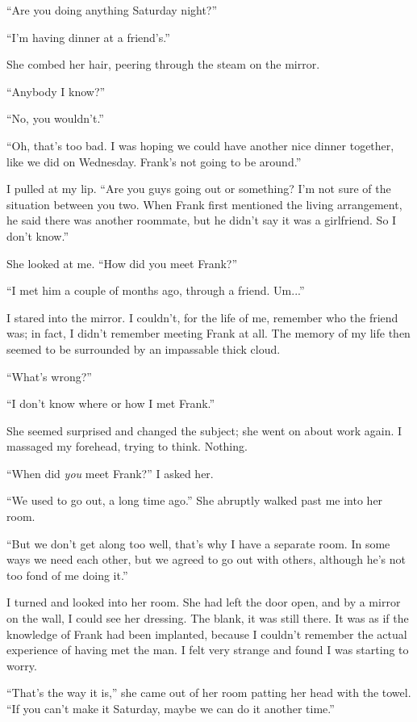 ``Are you doing anything Saturday night?''

``I'm having dinner at a friend's.''

She combed her hair, peering through the steam on the mirror.

``Anybody I know?''

``No, you wouldn't.''

``Oh, that's too bad. I was hoping we could have another nice dinner
together, like we did on Wednesday. Frank's not going to be around.''

I pulled at my lip. ``Are you guys going out or something? I'm not sure
of the situation between you two. When Frank first mentioned the living
arrangement, he said there was another roommate, but he didn't say it
was a girlfriend. So I don't know.''

She looked at me. ``How did you meet Frank?''

``I met him a couple of months ago, through a friend. Um...''

I stared into the mirror. I couldn't, for the life of me, remember who
the friend was; in fact, I didn't remember meeting Frank at all. The
memory of my life then seemed to be surrounded by an impassable thick
cloud.

``What's wrong?''

``I don't know where or how I met Frank.''

She seemed surprised and changed the subject; she went on about work
again. I massaged my forehead, trying to think. Nothing.

``When did \emph{you} meet Frank?'' I asked her.

``We used to go out, a long time ago.'' She abruptly walked past me into
her room.

``But we don't get along too well, that's why I have a separate room. In
some ways we need each other, but we agreed to go out with others,
although he's not too fond of me doing it.''

I turned and looked into her room. She had left the door open, and by a
mirror on the wall, I could see her dressing. The blank, it was still
there. It was as if the knowledge of Frank had been implanted, because I
couldn't remember the actual experience of having met the man. I felt
very strange and found I was starting to worry.

``That's the way it is,'' she came out of her room patting her head with
the towel. ``If you can't make it Saturday, maybe we can do it another
time.''

